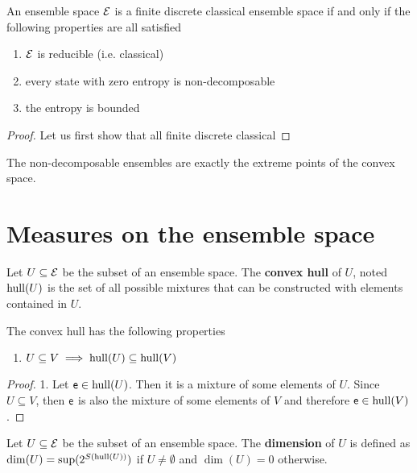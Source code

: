 \begin{conj}
	An ensemble space $\mathcal{E}$ is a finite discrete classical ensemble space if and only if the following properties are all satisfied
	\begin{enumerate}
		\item $\mathcal{E}$ is reducible (i.e. classical)
		\item every state with zero entropy is non-decomposable
		\item the entropy is bounded
	\end{enumerate}
\end{conj}

\begin{proof}
	Let us first show that all finite discrete classical 
\end{proof}

\begin{remark}
	The non-decomposable ensembles are exactly the extreme points of the convex space.
\end{remark}

\section{Measures on the ensemble space}

\begin{defn}
	Let $U \subseteq \mathcal{E}$ be the subset of an ensemble space. The \textbf{convex hull} of $U$, noted $\mathrm{hull}(U)$ is the set of all possible mixtures that can be constructed with elements contained in $U$.
\end{defn}

\begin{coro}
	The convex hull has the following properties
	\begin{enumerate}
		\item $U \subseteq V \implies \mathrm{hull}(U) \subseteq \mathrm{hull}(V)$
	\end{enumerate}
\end{coro}

\begin{proof}
	1. Let $\mathsf{e} \in \mathrm{hull}(U)$. Then it is a mixture of some elements of $U$. Since $U \subseteq V$, then $\mathsf{e}$ is also the mixture of some elements of $V$ and therefore $\mathsf{e} \in \mathrm{hull}(V)$.
\end{proof}

\begin{defn}
	Let $U \subseteq \mathcal{E}$ be the subset of an ensemble space. The \textbf{dimension} of $U$ is defined as $\dim(U) = \sup(2^{S(\mathrm{hull}(U))})$ if $U \neq \emptyset$ and $\dim(U) = 0$ otherwise.
\end{defn}

